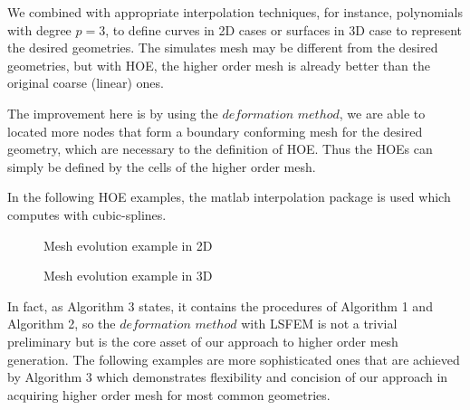 \documentclass{article}
\theoremstyle{definition}
\theoremstyle{remark}
\numberwithin{equation}{section}
\numberwithin{subsection}{section}
\begin{document}
We combined with appropriate interpolation techniques, for instance, polynomials with degree $p=3$, to define curves in 2D cases or surfaces in 3D case to represent the desired geometries. The simulates mesh may be different from the desired geometries, but with HOE, the higher order mesh is already better than the original coarse (linear) ones.

The improvement here is by using the $deformation$ $method$, we are able to located more nodes  that form a boundary conforming mesh for the desired geometry, which are necessary to the definition of HOE. Thus the HOEs can simply be defined by the cells of the higher order mesh. 

In the following HOE examples, the matlab interpolation package is used which computes with cubic-splines.
\begin{figure}[H]
	\caption{Mesh evolution example in 2D}
	\begin{center}
	\end{center}
\end{figure}

\begin{figure}[H]
	\caption{Mesh evolution example in 3D}
	\begin{center}
	\end{center}
\end{figure}

In fact, as Algorithm 3 states, it contains the procedures of Algorithm 1 and Algorithm 2, so the $deformation$ $method$ with LSFEM is not a trivial preliminary but is the core asset of our approach to higher order mesh generation. The following examples are more sophisticated ones that are achieved by Algorithm 3 which demonstrates flexibility and concision of our approach in acquiring higher order mesh for most common geometries. 
\end{document}
